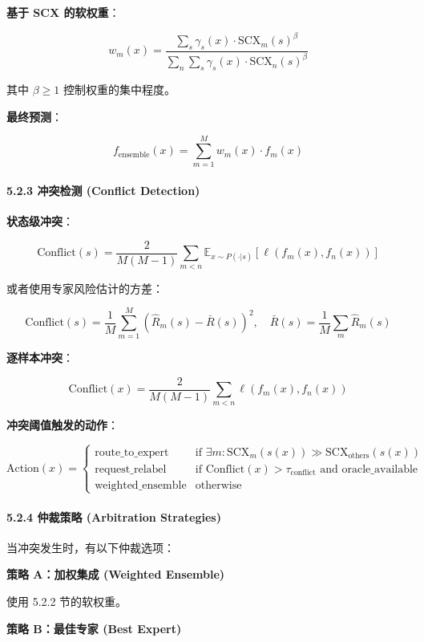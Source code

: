 \documentclass[
  12pt,
]{ctexart}
\begin{document}
\textbf{基于 SCX 的软权重}：

\[
w_m(x) = \frac{\sum_s \gamma_s(x) \cdot \text{SCX}_m(s)^\beta}{\sum_n \sum_s \gamma_s(x) \cdot \text{SCX}_n(s)^\beta}
\]

其中 \(\beta \geq 1\) 控制权重的集中程度。

\textbf{最终预测}：

\[
f_{\text{ensemble}}(x) = \sum_{m=1}^M w_m(x) \cdot f_m(x)
\]

\paragraph{5.2.3 冲突检测 (Conflict
Detection)}\label{ux51b2ux7a81ux68c0ux6d4b-conflict-detection}

\textbf{状态级冲突}：

\[
\text{Conflict}(s) = \frac{2}{M(M-1)} \sum_{m < n} \mathbb{E}_{x \sim P(\cdot|s)}[\ell(f_m(x), f_n(x))]
\]

或者使用专家风险估计的方差：

\[
\text{Conflict}(s) = \frac{1}{M} \sum_{m=1}^M (\hat{R}_m(s) - \bar{R}(s))^2, \quad \bar{R}(s) = \frac{1}{M} \sum_m \hat{R}_m(s)
\]

\textbf{逐样本冲突}：

\[
\text{Conflict}(x) = \frac{2}{M(M-1)} \sum_{m < n} \ell(f_m(x), f_n(x))
\]

\textbf{冲突阈值触发的动作}：

\[
\text{Action}(x) = \begin{cases}
\text{route\_to\_expert} & \text{if } \exists m: \text{SCX}_m(s(x)) \gg \text{SCX}_{\text{others}}(s(x)) \\
\text{request\_relabel} & \text{if } \text{Conflict}(x) > \tau_{\text{conflict}} \text{ and } \text{oracle\_available} \\
\text{weighted\_ensemble} & \text{otherwise}
\end{cases}
\]

\paragraph{5.2.4 仲裁策略 (Arbitration
Strategies)}\label{ux4ef2ux88c1ux7b56ux7565-arbitration-strategies}

当冲突发生时，有以下仲裁选项：

\textbf{策略 A：加权集成 (Weighted Ensemble)}

使用 5.2.2 节的软权重。

\textbf{策略 B：最佳专家 (Best Expert)}
\end{document}

